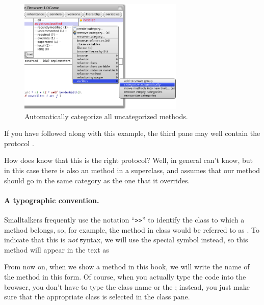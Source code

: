 \documentclass[a4paper,10pt,twoside]{book}
\begin{document}
\begin{figure}[htbp]
   \centering
   \includegraphics[width=0.7\textwidth]{Categorize} 
   \caption{Automatically categorize all uncategorized methods.\label{fig:categorize}}
\end{figure}

If you have followed along with this example, the third pane may well contain the protocol .

How does \pharo{} know that this is the right protocol?  Well, in general \pharo{} can't know, but in this case there is also an  method in a superclass, and \pharo assumes that our  method should go in the same category as the one that it overrides.


\paragraph{A typographic convention.} Smalltalkers frequently use the notation ``\verb|>>|'' to identify the class to which a method belongs, so, for example, the  method in class  would be referred to as .
To indicate that this is \emph{not} \st syntax, we will use the special symbol \ct{>>>} instead, so this method will appear in the text as 

From now on, when we show a method in this book, we will write the name of the method in this form.  Of course, when you actually type the code into the browser, you don't have to type the class name or the \ct{>>>}; instead, you just make sure that the appropriate class is selected in the class pane.  
\end{document}
